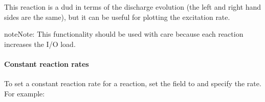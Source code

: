 \documentclass[letterpaper,10pt,english]{sphinxmanual}
\begin{document}
This reaction is a dud in terms of the discharge evolution (the left and right hand sides are the same), but it can be useful for plotting the excitation rate.

\begin{sphinxadmonition}{note}{Note:}
This functionality should be used with care because each reaction increases the I/O load.
\end{sphinxadmonition}


\paragraph{Constant reaction rates}
\label{\detokenize{Applications/CdrPlasmaModel:constant-reaction-rates}}
To set a constant reaction rate for a reaction, set the field  to  and specify the rate.
For example:

\begin{sphinxVerbatim}[commandchars=\\\{\},formatcom=\scriptsize]
  \PYG{p}{[}
       
       
       
  \PYG{p}{]}
\end{sphinxVerbatim}
\end{document}

